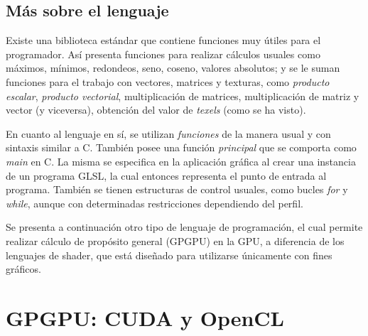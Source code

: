 


\subsection{M\'as sobre el lenguaje}
Existe una biblioteca est\'andar que contiene funciones muy \'utiles para el programador. As\'i presenta funciones para realizar c\'alculos usuales como m\'aximos, m\'inimos, redondeos, seno, coseno, valores absolutos; y se le suman funciones para el trabajo con vectores, matrices y texturas, como {\em producto escalar}, {\em producto vectorial}, multiplicaci\'on de matrices, multiplicaci\'on de matriz y vector (y viceversa), obtenci\'on del valor de {\em texels} (como se ha visto).

En cuanto al lenguaje en s\'i, se utilizan {\em funciones} de la manera usual y con sintaxis similar a C.
Tambi\'en posee una funci\'on {\em principal} que se comporta como {\em main} en C.
La misma se especifica en la aplicaci\'on gr\'afica al crear una instancia de un programa GLSL, la cual entonces representa el punto de entrada al programa.
Tambi\'en se tienen estructuras de control usuales, como bucles {\em for} y {\em while}, aunque con determinadas restricciones dependiendo del perfil.

Se presenta a continuaci\'on otro tipo de lenguaje de programaci\'on, el cual permite realizar c\'alculo de prop\'osito general (GPGPU) en la GPU, a diferencia de los lenguajes de shader, que est\'a dise\~nado para utilizarse \'unicamente con fines gr\'aficos.

\section{GPGPU: CUDA y OpenCL}

